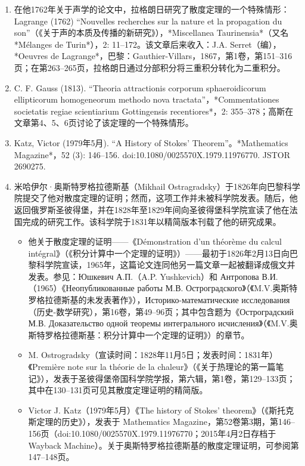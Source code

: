 \begin{enumerate}
\item 在他1762年关于声学的论文中，拉格朗日研究了散度定理的一个特殊情形：Lagrange (1762) “Nouvelles recherches sur la nature et la propagation du son”（《关于声的本质及传播的新研究》），*Miscellanea Taurinensia*（又名 *Mélanges de Turin*），2: 11–172。该文章后来收入：J.A. Serret（编），*Oeuvres de Lagrange*，巴黎：Gauthier-Villars，1867，第1卷，第151–316页；在第263–265页，拉格朗日通过分部积分将三重积分转化为二重积分。
\item C. F. Gauss (1813). “Theoria attractionis corporum sphaeroidicorum ellipticorum homogeneorum methodo nova tractata”，*Commentationes societatis regiae scientiarium Gottingensis recentiores*，2: 355–378；高斯在文章第4、5、6页讨论了该定理的一个特殊情形。
\item Katz, Victor (1979年5月). “A History of Stokes' Theorem”。*Mathematics Magazine*，52 (3): 146–156. doi:10.1080/0025570X.1979.11976770. JSTOR 2690275.
\item 米哈伊尔·奥斯特罗格拉德斯基（Mikhail Ostragradsky）于1826年向巴黎科学院提交了他对散度定理的证明；然而，这项工作并未被科学院发表。随后，他返回俄罗斯圣彼得堡，并在1828年至1829年间向圣彼得堡科学院宣读了他在法国完成的研究工作。该科学院于1831年以精简版本刊载了他的研究成果。
\begin{itemize}
\item 他关于散度定理的证明——《Démonstration d'un théorème du calcul intégral》（《积分计算中一个定理的证明》）——最初于1826年2月13日向巴黎科学院宣读，1965年，这篇论文连同他另一篇文章一起被翻译成俄文并发表。参见：Юшкевич А.П.（A.P. Yushkevich）和 Антропова В.И.（1965）《Неопубликованные работы М.В. Остроградского》（《M.V.奥斯特罗格拉德斯基的未发表著作》），Историко-математические исследования（历史-数学研究），第16卷，第49–96页；其中包含题为《Остроградский М.В. Доказательство одной теоремы интегрального исчисления》（《M.V.奥斯特罗格拉德斯基：积分计算中一个定理的证明》）的章节。
\item M. Ostrogradsky（宣读时间：1828年11月5日；发表时间：1831年）《Première note sur la théorie de la chaleur》（《关于热理论的第一篇笔记》），发表于圣彼得堡帝国科学院学报，第六辑，第1卷，第129–133页；其中在130–131页可见其散度定理证明的精简版。
\item Victor J. Katz（1979年5月）《The history of Stokes' theorem》（《斯托克斯定理的历史》），发表于 Mathematics Magazine，第52卷第3期，第146–156页（doi:10.1080/0025570X.1979.11976770；2015年4月2日存档于Wayback Machine）。关于奥斯特罗格拉德斯基的散度定理证明，可参阅第147–148页。
\end{itemize}

\end{enumerate}

